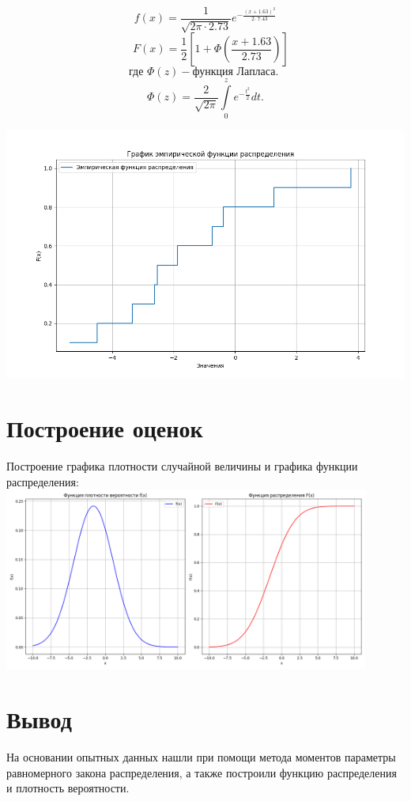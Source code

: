 \documentclass{article}
\begin{document}
\[f(x) = \frac{1}{\sqrt{2 \pi \cdot 2.73}} e^{- \frac{(x + 1.63)^2}{2 \cdot 7.43}}\]
\[\quad F(x) = \frac{1}{2} \left[1 + \Phi\left(\frac{x + 1.63}{2.73}\right)\right]\]
\[\text{где } \Phi(z) - \text{функция Лапласа. }\]
\[\Phi(z) = \frac{2}{\sqrt{2\pi}} \int\limits_0^z e^{-\frac{t^2}{2}} dt.\]

\includegraphics[width=.9\textwidth]{emp.png}

\newpage
\section{Построение оценок}
Построение графика плотности случайной величины и графика функции распределения:\\

\includegraphics[width=0.9\textwidth]{funcs.png}

\section*{Вывод}
На основании опытных данных нашли при помощи метода моментов параметры равномерного закона распределения, а также построили функцию распределения и плотность вероятности.
\end{document}
